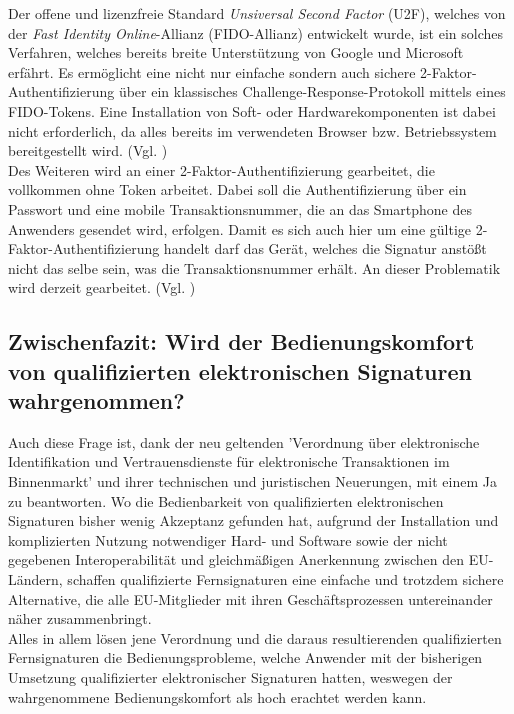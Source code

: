 \documentclass[deutsch]{lib/llncs/llncs}
\begin{document}
Der offene und lizenzfreie Standard \textit{Unsiversal Second Factor} (U2F), welches von der \textit{Fast Identity Online}-Allianz (FIDO-Allianz) entwickelt wurde, ist ein solches Verfahren, welches bereits breite Unterstützung von Google und Microsoft erfährt. Es ermöglicht eine nicht nur einfache sondern auch sichere 2-Faktor-Authentifizierung über ein klassisches Challenge-Response-Protokoll mittels eines FIDO-Tokens. Eine Installation von Soft- oder Hardwarekomponenten ist dabei nicht erforderlich, da alles bereits im verwendeten  Browser bzw. Betriebssystem bereitgestellt wird. (Vgl. \cite[S. 234]{entschew2016neue}) \\
Des Weiteren wird an einer 2-Faktor-Authentifizierung gearbeitet, die vollkommen ohne Token arbeitet. Dabei soll die Authentifizierung über ein Passwort und eine mobile Transaktionsnummer, die an das Smartphone des Anwenders gesendet wird, erfolgen. Damit es sich auch hier um eine gültige 2-Faktor-Authentifizierung handelt darf das Gerät, welches die Signatur anstößt nicht das selbe sein, was die Transaktionsnummer erhält. An dieser Problematik wird derzeit gearbeitet. (Vgl. \cite[S. 32]{schmeh2017neue})


\subsection{Zwischenfazit: Wird der Bedienungskomfort von qualifizierten elektronischen Signaturen wahrgenommen?}
Auch diese Frage ist, dank der neu geltenden 'Verordnung über elektronische Identifikation und Vertrauensdienste für elektronische Transaktionen im Binnenmarkt' und ihrer technischen und juristischen Neuerungen, mit einem Ja zu beantworten. Wo die Bedienbarkeit von qualifizierten elektronischen Signaturen bisher wenig Akzeptanz gefunden hat, aufgrund der Installation und komplizierten Nutzung notwendiger Hard- und Software sowie der nicht gegebenen Interoperabilität und gleichmäßigen Anerkennung zwischen den EU-Ländern, schaffen qualifizierte Fernsignaturen eine einfache und trotzdem sichere Alternative, die alle EU-Mitglieder mit ihren Geschäftsprozessen untereinander näher zusammenbringt. \\
Alles in allem lösen jene Verordnung und die daraus resultierenden qualifizierten Fernsignaturen die Bedienungsprobleme, welche Anwender mit der bisherigen Umsetzung qualifizierter elektronischer Signaturen hatten, weswegen der wahrgenommene Bedienungskomfort als hoch erachtet werden kann.
\end{document}
